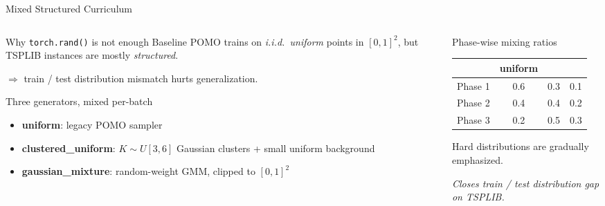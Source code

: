\documentclass[aspectratio=169,11pt]{beamer}
\newcommand{\compacttable}{%
  \scriptsize
  \setlength{\tabcolsep}{2.2pt}%
  \renewcommand{\arraystretch}{1.08}%
}
\newcommand{\tightitems}{%
  \setlength{\itemsep}{1.5pt}%
  \setlength{\parsep}{0pt}%
  \setlength{\topsep}{2pt}%
}
\begin{document}
\begin{frame}[t]{Mixed Structured Curriculum}
  \small
  \begin{columns}[T,onlytextwidth]
    \begin{column}{0.55\textwidth}
      \begin{block}{Why \texttt{torch.rand()} is not enough}
        Baseline POMO trains on \emph{i.i.d.\ uniform} points in $[0,1]^2$,
        but TSPLIB instances are mostly \emph{structured}.

        \vspace{0.05cm}
        $\Rightarrow$ train / test distribution mismatch hurts generalization.
      \end{block}
      \begin{block}{Three generators, mixed per-batch}
        \begin{itemize}\tightitems
          \item \textbf{uniform}: legacy POMO sampler
          \item \textbf{clustered\_uniform}: $K\sim U[3,6]$ Gaussian clusters + small uniform background
          \item \textbf{gaussian\_mixture}: random-weight GMM, clipped to $[0,1]^2$
        \end{itemize}
      \end{block}
    \end{column}
    \hfill
    \begin{column}{0.42\textwidth}
      \begin{block}{Phase-wise mixing ratios}
        \compacttable
        \begin{tabularx}{\linewidth}{@{}Y c c c@{}}
          \toprule
                  & uniform &  &  \\
          \midrule
          Phase 1 & 0.6     & 0.3       & 0.1      \\
          Phase 2 & 0.4     & 0.4       & 0.2      \\
          Phase 3 & 0.2     & 0.5       & 0.3      \\
          \bottomrule
        \end{tabularx}
        \par\vspace{0.16cm}
        Hard distributions are gradually emphasized.
      \end{block}
      \centering
      {\color{sdmblue}\itshape\small Closes train / test distribution gap on TSPLIB.}
    \end{column}
  \end{columns}
\end{frame}
\end{document}
